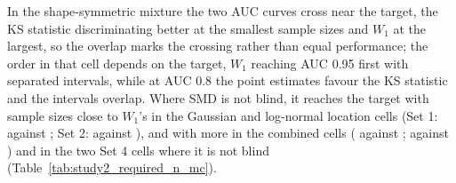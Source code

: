 \documentclass[AMA,Times1COL]{WileyNJDv5}
\begin{document}
In the shape-symmetric mixture the two AUC curves cross near the target, the KS statistic discriminating better at the smallest sample sizes and $W_1$ at the largest, so the overlap marks the crossing rather than equal performance; the order in that cell depends on the target, $W_1$ reaching AUC 0.95 first with separated intervals, while at AUC 0.8 the point estimates favour the KS statistic and the intervals overlap. Where SMD is not blind, it reaches the target with sample sizes close to $W_1$'s in the Gaussian and log-normal location cells (Set 1:  against ; Set 2:  against ), and with more in the combined cells ( against ;  against ) and in the two Set 4 cells where it is not blind (Table~\ref{tab:study2_required_n_mc}).
\end{document}
